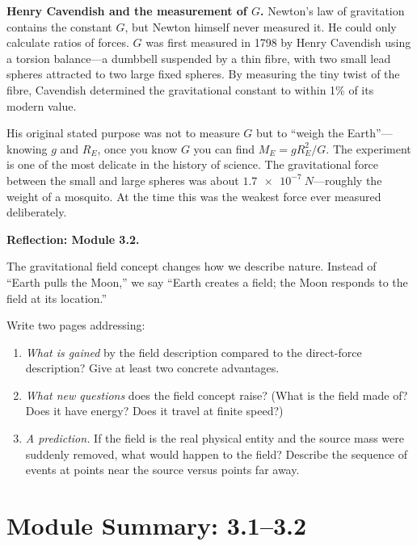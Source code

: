 \documentclass[12pt, a4paper, twoside]{book}
\theoremstyle{disc}
\begin{document}
\begin{historybox}
\textbf{Henry Cavendish and the measurement of $G$.} Newton's law of gravitation contains the constant $G$, but Newton himself never measured it. He could only calculate ratios of forces. $G$ was first measured in 1798 by Henry Cavendish using a torsion balance---a dumbbell suspended by a thin fibre, with two small lead spheres attracted to two large fixed spheres. By measuring the tiny twist of the fibre, Cavendish determined the gravitational constant to within 1\% of its modern value.

His original stated purpose was not to measure $G$ but to ``weigh the Earth''---knowing $g$ and $R_E$, once you know $G$ you can find $M_E = gR_E^2/G$. The experiment is one of the most delicate in the history of science. The gravitational force between the small and large spheres was about $\SI{1.7e-7}{N}$---roughly the weight of a mosquito. At the time this was the weakest force ever measured deliberately.
\end{historybox}

\begin{reflectionbox}
\textbf{Reflection: Module 3.2.}

The gravitational field concept changes how we describe nature. Instead of ``Earth pulls the Moon,'' we say ``Earth creates a field; the Moon responds to the field at its location.''

Write two pages addressing:
\begin{enumerate}[leftmargin=2em,itemsep=4pt]
  \item \textit{What is gained} by the field description compared to the direct-force description? Give at least two concrete advantages.
  \item \textit{What new questions} does the field concept raise? (What is the field made of? Does it have energy? Does it travel at finite speed?)
  \item \textit{A prediction.} If the field is the real physical entity and the source mass were suddenly removed, what would happen to the field? Describe the sequence of events at points near the source versus points far away.
\end{enumerate}
\end{reflectionbox}

\chapter*{Module Summary: 3.1--3.2}
\end{document}
